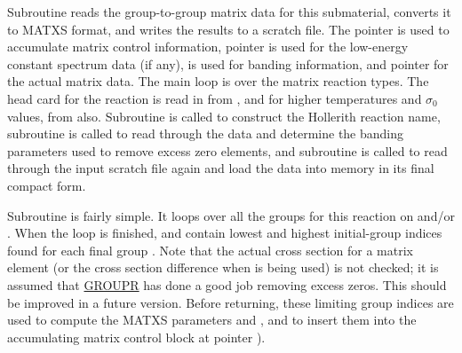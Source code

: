 Subroutine  reads the
group-to-group matrix data for this submaterial, converts it
to MATXS format, and writes the results to a scratch file.
 The pointer  is used to accumulate matrix control
information, pointer  is used for the low-energy
constant spectrum data (if any),  is used for
banding information, and pointer  for the
actual matrix data.  The main loop is over the  matrix
reaction types.  The head card for the reaction is read in from
, and for higher temperatures and $\sigma_0$ values, from
 also.  Subroutine  is called to construct the
Hollerith reaction name, subroutine  is called to read
through the data and determine the banding parameters used to remove
excess zero elements, and subroutine  is called to read
through the input scratch file again and load the data into memory
in its final compact form.

Subroutine  is fairly simple.  It
loops over all the groups for this reaction on  and/or
.  When the loop is finished,  and
 contain lowest and highest initial-group indices
found for each final group .  Note that the actual
cross section for a matrix element (or the cross section
difference when  is being used) is not checked;
it is assumed that \hyperlink{sGROUPRhy}{GROUPR} has
done a good job removing excess zeros.
This should be improved in a future version.  Before returning, these
limiting group indices are used to compute the MATXS parameters
 and , and to insert them into the accumulating
matrix control block at pointer ).

